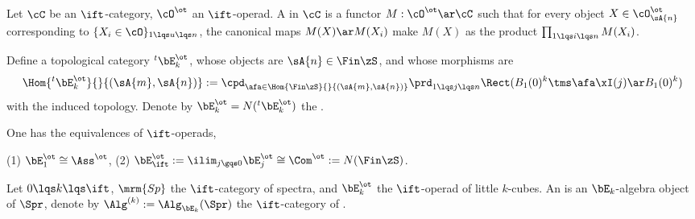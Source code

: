 \documentclass[article, a4paper, twoside]{universal}
\begin{document}
\begin{dfn}[2.4.2.1]
    Let $\cC$ be an $\ift$-category, $\cO^{\ot}$ an $\ift$-operad. A  in $\cC$ is a functor $M:\cO^{\ot}\ar\cC$ such that for every object $X\in\cO_{\sA{n}}^{\ot}$ corresponding to $\{X_{i}\in\cO\}_{1\lqs u\lqs n}$, the canonical maps $M(X)\ar M(X_{i})$ make $M(X)$ as the product $\prod_{1\lqs i\lqs n} M(X_{i})$.
\end{dfn}


\begin{dfn}[5.1.0.2, 5.1.0.4]
    Define a topological category ${}^{t}\bE_{k}^{\ot}$, whose objects are $\sA{n}\in\Fin\zS$, and whose morphisms are
    \[
        \Hom{{}^{t}\bE_{k}^{\ot}}{}{(\sA{m},\sA{n})}:=\cpd_{\afa\in\Hom{\Fin\zS}{}{(\sA{m},\sA{n})}}\prd_{1\lqs j\lqs n}\Rect(B_{1}(0)^{k}\tms\afa\xI(j)\ar B_{1}(0)^{k})
    \]
    with the induced topology. Denote by $\bE_{k}^{\ot}=N({}^{t}\bE_{k}^{\ot})$ the .
\end{dfn}

\begin{thm}[5.1.0.7, 5.1.1.5]
    One has the equivalences of $\ift$-operads,

    (1) $\bE_{1}^{\ot}\cong\Ass^{\ot}$, (2) $\bE_{\ift}^{\ot}:=\ilim_{j\gqs0}\bE_{j}^{\ot}\cong \Com^{\ot}:=N(\Fin\zS)$.
\end{thm}


\begin{dfn}[7.1.0.1]
    Let $0\lqs k\lqs \ift$, $\mrm{Sp}$ the $\ift$-category of spectra, and $\bE_{k}^{\ot}$ the $\ift$-operad of little $k$-cubes. An  is an $\bE_{k}$-algebra object of $\Spr$, denote by $\Alg^{(k)}:=\Alg_{\bE_{k}}(\Spr)$ the $\ift$-category of .
\end{dfn}



\printref
\end{document}
